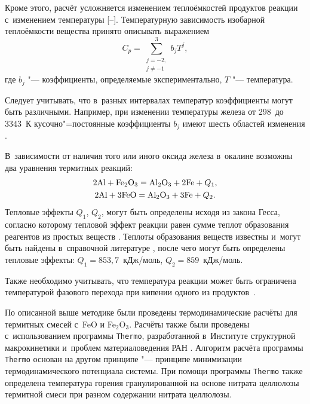 Кроме этого, расчёт усложняется изменением теплоёмкостей продуктов реакции с~изменением температуры [--]. 
Температурную зависимость изобарной теплоёмкости вещества принято описывать выражением
\begin{equation*}
C_p =\sum_{\substack{j=-2, \\
 j \ne -1}}^3 b_j T^j,
\end{equation*}
где $b_j$ "--- коэффициенты, определяемые экспериментально,
$T$ "--- температура. %

Следует учитывать, что в~разных интервалах температур коэффициенты могут быть различными. 
Например, при изменении температуры железа от 298~до 3343~К кусочно"=постоянные коэффициенты $b_j$ имеют шесть областей изменения \cite{yatc11:bib18}.

В~зависимости от наличия того или иного оксида железа в~окалине возможны два уравнения термитных реакций:
\begin{gather}
\label{yatc11:eq3}
2{\rm Al} + {\rm Fe}_2{\rm O}_3={\rm Al}_2{\rm O}_3 + 2 {\rm Fe} + {Q}_1, \\
\label{yatc11:eq4}
2{\rm Al} + 3{\rm FeO} = {\rm Al}_2 {\rm O}_3 + 3{\rm Fe} + {Q}_2.
\end{gather}
Тепловые эффекты $Q_1$, $Q_2$, могут быть определены исходя из закона Гесса, согласно которому тепловой эффект реакции равен
сумме теплот образования реагентов из простых веществ \cite{yatc11:bib2}. 
Теплоты образования веществ известны и~могут быть найдены в~справочной литературе \cite{yatc11:bib18}, после чего могут быть определены тепловые эффекты: $Q_1=853,7$~кДж/моль, $Q_2=859$~кДж/моль.

Также необходимо учитывать, что температура реакции может быть огра\-ни\-че\-на температурой фазового перехода при кипении одного из продуктов~\cite{yatc11:bib19}.

По описанной выше методике были проведены термодинамические расчёты для термитных смесей с~FeO и Fe$_2$O$_3$. 
Расчёты также были проведены с~использованием программы {\tt Thermo}, разработанной в~Институте структурной макрокинетики и~проблем материаловедения РАН \cite{yatc11:bib4}. 
Алгоритм расчёта программы {\tt Thermo} основан на другом принципе "--- принципе минимизации термодинамического потенциала системы. 
При помощи программы {\tt Thermo} также определена температура горения гранулированной на основе нитрата целлюлозы термитной смеси при разном содержании нитрата целлюлозы.

